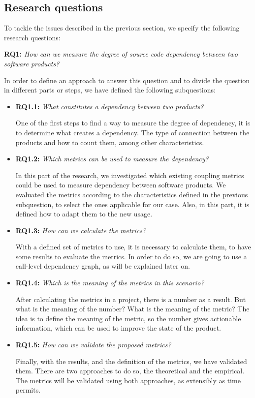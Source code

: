 \subsection{Research questions} %
To tackle the issues described in the previous section, we specify the following research questions:

\blankl
\textbf{RQ1:} \textit{How can we measure the degree of source code dependency between two software products?}

In order to define an approach to answer this question and to divide the question in different parts or steps, we have defined the following subquestions:

\begin{itemize}
  \item \textbf{RQ1.1:} \textit{What constitutes a dependency between two products?}

  One of the first steps to find a way to measure the degree of dependency, it is to determine what creates a dependency. The type of connection between the products and how to count them, among other characteristics.
  \blankl

  \item \textbf{RQ1.2:} \textit{Which metrics can be used to measure the dependency?}

  In this part of the research, we investigated which existing coupling metrics could be used to measure dependency between software products. We evaluated the metrics according to the characteristics defined in the previous subquestion, to select the ones applicable for our case. Also, in this part, it is defined how to adapt them to the new usage.
  \blankl

  \item \textbf{RQ1.3:} \textit{How can we calculate the metrics?}

  With a defined set of metrics to use, it is necessary to calculate them, to have some results to evaluate the metrics. In order to do so, we are going to use a call-level dependency graph, as will be explained later on.
  \blankl

  \item \textbf{RQ1.4:} \textit{Which is the meaning of the metrics in this scenario?}

  After calculating the metrics in a project, there is a number as a result. But what is the meaning of the number? What is the meaning of the metric? The idea is to define the meaning of the metric, so the number gives actionable information, which can be used to improve the state of the product.
  \blankl

  \item \textbf{RQ1.5:} \textit{How can we validate the proposed metrics?}

  Finally, with the results, and the definition of the metrics, we have validated them. There are two approaches to do so, the theoretical and the empirical. The metrics will be validated using both approaches, as extensibly as time permits.
\end{itemize}

